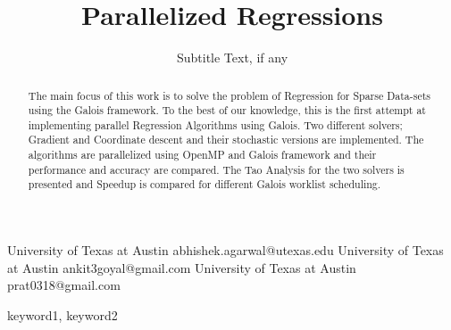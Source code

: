 \documentclass{sigplanconf}
\begin{document}
\setlength{\pdfpageheight}{\paperheight}
\setlength{\pdfpagewidth}{\paperwidth}






\title{Parallelized Regressions}
\subtitle{Subtitle Text, if any}

           {University of Texas at Austin}
           {abhishek.agarwal@utexas.edu}
           {University of Texas at Austin}
           {ankit3goyal@gmail.com}
           {University of Texas at Austin}
           {prat0318@gmail.com}

\maketitle

\begin{abstract}
The main focus of this work is to solve the problem of Regression for Sparse Data-sets using the Galois framework.
To the best of our knowledge, this is the first attempt at implementing parallel Regression Algorithms using
Galois. Two different solvers; Gradient and Coordinate descent and their stochastic versions are implemented. The
algorithms are parallelized using OpenMP and Galois framework and their performance and accuracy are compared.
The Tao Analysis for the two solvers is presented and Speedup is compared for different Galois worklist scheduling. 
\end{abstract}


\keywords
keyword1, keyword2
\end{document}
